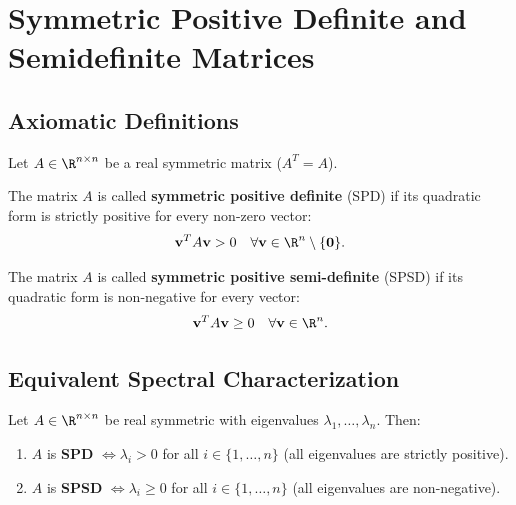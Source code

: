 \FloatBarrier
\section{Symmetric Positive Definite and Semidefinite Matrices}
\label{sec:en:spd-spsd-matrices}

\subsection{Axiomatic Definitions}

Let $A \in \R^{n \times n}$ be a real symmetric matrix ($A^T = A$).

\begin{definition}
The matrix $A$ is called \textbf{symmetric positive definite} (SPD) if its quadratic form is strictly positive for every non-zero vector:
\begin{equation}
    \mathbf{v}^T A \mathbf{v} > 0 \quad \forall \mathbf{v} \in \R^n \setminus \{\mathbf{0}\}.
\end{equation}
\end{definition}

\begin{definition}
The matrix $A$ is called \textbf{symmetric positive semi-definite} (SPSD) if its quadratic form is non-negative for every vector:
\begin{equation}
    \mathbf{v}^T A \mathbf{v} \ge 0 \quad \forall \mathbf{v} \in \R^n.
\end{equation}
\end{definition}

\subsection{Equivalent Spectral Characterization}

\begin{theorem}
\label{thm:spectral-criterion-spd}
Let $A \in \R^{n \times n}$ be real symmetric with eigenvalues $\lambda_1, \dots, \lambda_n$. Then:
\begin{enumerate}
    \item $A$ is \textbf{SPD} $\iff \lambda_i > 0$ for all $i \in \{1, \dots, n\}$ (all eigenvalues are strictly positive).
    \item $A$ is \textbf{SPSD} $\iff \lambda_i \ge 0$ for all $i \in \{1, \dots, n\}$ (all eigenvalues are non-negative).
\end{enumerate}
\end{theorem}

